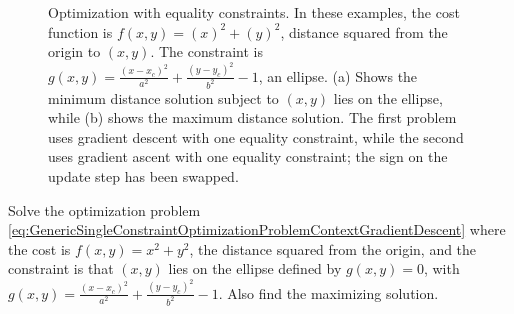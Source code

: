 \bigskip

\begin{figure}[htb]%
\centering
{}%
\hspace{.3cm}
\hfill
\caption[]{Optimization with equality constraints. In these examples, the cost function is $f(x,y) = (x)^2 + (y)^2$, distance squared from the origin to $(x, y)$. The constraint is $g(x,y) = \frac{(x-x_c)^2}{a^2} + \frac{(y-y_c)^2}{b^2} - 1$, an ellipse. (a) Shows the minimum distance solution subject to $(x,y)$ lies on the ellipse, while (b) shows the maximum distance solution. The first problem uses gradient descent with one equality constraint, while the second uses gradient ascent with one equality constraint; the sign on the update step has been swapped.}
    \label{fig:GradientDescentWithOneEqualityConstraint}
\end{figure}

\bigskip

\begin{example} Solve the optimization problem \eqref{eq:GenericSingleConstraintOptimizationProblemContextGradientDescent} where the cost is $f(x,y) = x^2 + y^2$, the distance squared from the origin, and the constraint is that $(x,y)$ lies on the ellipse defined by $g(x,y)=0$, with $g(x,y) = \frac{(x-x_c)^2}{a^2} + \frac{(y-y_c)^2}{b^2} - 1$. Also find the maximizing solution. 
    
\end{example}

